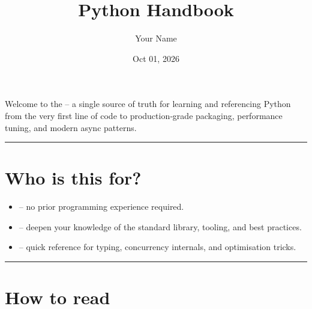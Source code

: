 \documentclass[a4paper,11pt,english]{sphinxmanual}
\title{Python Handbook}
\date{Oct 01, 2026}
\author{Your Name}
\begin{document}
\pagestyle{empty}
\sphinxmaketitle
\pagestyle{plain}
\sphinxtableofcontents
\pagestyle{normal}
\label{\detokenize{index::doc}}


\sphinxAtStartPar
Welcome to the  – a single source of truth for learning and referencing Python from the very first line of code to production‑grade packaging, performance tuning, and modern async patterns.


\bigskip\hrule\bigskip



\chapter{Who is this for?}
\label{\detokenize{index:who-is-this-for}}\begin{itemize}
\item {} 
\sphinxAtStartPar
{} – no prior programming experience required.

\item {} 
\sphinxAtStartPar
{} – deepen your knowledge of the standard library, tooling, and best practices.

\item {} 
\sphinxAtStartPar
{} – quick reference for typing, concurrency internals, and optimisation tricks.

\end{itemize}


\bigskip\hrule\bigskip



\chapter{How to read}
\label{\detokenize{index:how-to-read}}
\end{document}
